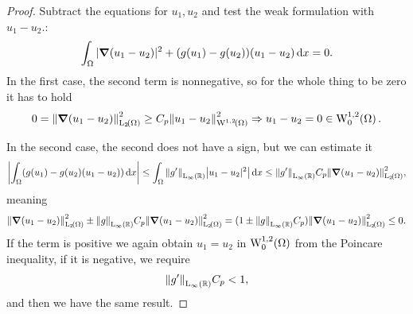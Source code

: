 \documentclass{article}
\begin{document}
\begin{example}
\begin{proof}
Subtract the equations for $u_1, u_2$ and test the weak formulation with $u_1 - u_2.$:
	\[
		\int_{\Omega}|\grad(u_1 - u_2)|^{2} + (g(u_1)-g(u_2))\qty(u_1-u_2)\dd{x} = 0.
	\]
	In the first case, the second term is nonnegative, so for the whole thing to be zero it has to hold 
	\[
		0=\norm{\grad(u_1 - u_2)}_{\LpSet[2]{\Omega}}^{2} \geq C_p \norm{u_1 - u_2}_{\WkpSet[1][2]{\Omega}}^{2} \Rightarrow u_1 - u_2 = 0 \in \WkpzeroSet[1][2]{\Omega}.
	\]

	In the second case, the second does not have a sign, but we can estimate it
	\[
		\abs{\int_{\Omega}(g(u_1)-g(u_2)(u_1-u_2))\dd{x}} \leq \int_{\Omega}\norm{g'}_{\LinfSet{\R}}\abs{u_1 - u_2|^{2}}\dd{x} \leq \norm{g'}_{\LinfSet{\R}} C_p \norm{\grad(u_1 - u_2)}_{\LpSet[2]{\Omega}}^{2}, 
	\]
	meaning
	\[
		\norm{\grad\qty(u_1 - u_2)}_{\LpSet[2]{\Omega}}^{2} \pm \norm{g}_{\LinfSet{\R}}C_p \norm{\grad\qty(u_1 - u_2)}_{\LpSet[2]{\Omega}}^{2}  = (1 \pm \norm{g}_{\LinfSet{\R}}C_p)\norm{\grad\qty(u_1 - u_2)}_{\LpSet[2]{\Omega}}^{2} \leq 0.
	\]
	If the term is positive we again obtain $u_1 = u_2$ in $\WkpzeroSet[1][2]{\Omega}$ from the Poincare inequality, if it is negative, we require
	\[
		\norm{g'}_{\text{L}_{\infty}\!\,\left({\mathbb R} \right)}C_p < 1,
	\]
	and then we have the same result.
\end{proof}
\end{example}
\end{document}
